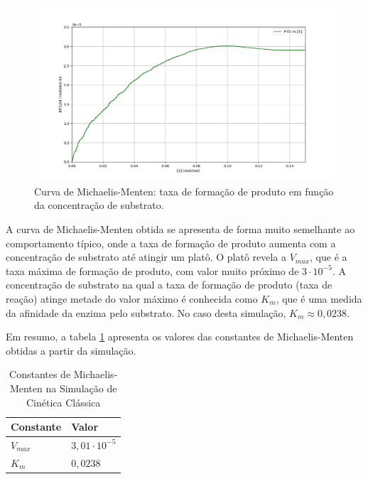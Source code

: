 \documentclass[12pt,oneside]{report}
\begin{document}
\begin{figure}[H]
    \centering
    \includegraphics[width=1\textwidth]{MM_curve.png}
    \caption{\small Curva de Michaelis-Menten: taxa de formação de produto em função da concentração de substrato.}
    \label{fig:MM_curve}
\end{figure}

A curva de Michaelis-Menten obtida se apresenta de forma muito semelhante ao comportamento típico, onde a taxa de formação de produto aumenta com a concentração de substrato até atingir um platô. O platô revela a $V_{max}$, que é a taxa máxima de formação de produto, com valor muito próximo de $3 \cdot 10^{-5}$. A concentração de substrato na qual a taxa de formação de produto (taxa de reação) atinge metade do valor máximo é conhecida como $K_m$, que é uma medida da afinidade da enzima pelo substrato. No caso desta simulação, $K_m \approx 0{,}0238$.

Em resumo, a tabela \ref{tab:params_MM} apresenta os valores das constantes de Michaelis-Menten obtidas a partir da simulação.

\begin{table}[H]
    \centering
    \caption{Constantes de Michaelis-Menten na Simulação de Cinética Clássica}
    \vspace{0.2cm}
    \begin{tabularx}{\textwidth}{X m{5cm}}
        \hline
        \textbf{Constante} & \textbf{Valor}         \\
        \hline
        $V_{max}$          & $3{,}01 \cdot 10^{-5}$ \\
        $K_m$              & $0{,}0238$             \\
        \hline
    \end{tabularx}
    \vspace{0.2cm}
    \label{tab:params_MM}
\end{table}
\end{document}

